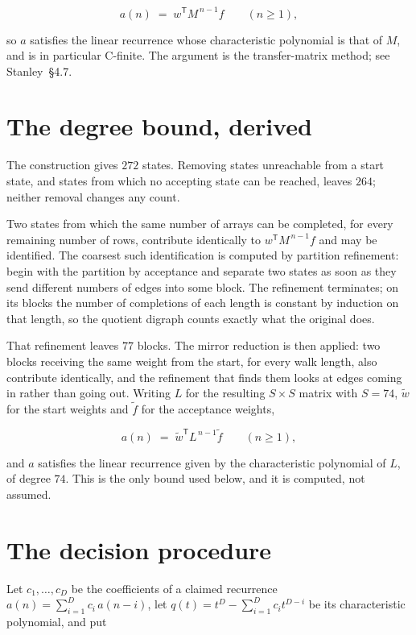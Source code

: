 \documentclass[11pt]{article}
\theoremstyle{definition}
\begin{document}
\[a(n) \;=\; w^{\mathsf T} M^{\,n-1} f \qquad (n \ge 1),\]

so $a$ satisfies the linear recurrence whose characteristic polynomial is that of $M$, and is in particular C-finite. The argument is the transfer-matrix method; see Stanley~\S4.7.

\section{The degree bound, derived}

The construction gives $272$ states. Removing states unreachable from a start state, and states from which no accepting state can be reached, leaves $264$; neither removal changes any count.

Two states from which the same number of arrays can be completed, for every remaining number of rows, contribute identically to $w^{\mathsf T}M^{\,n-1}f$ and may be identified. The coarsest such identification is computed by partition refinement: begin with the partition by acceptance and separate two states as soon as they send different numbers of edges into some block. The refinement terminates; on its blocks the number of completions of each length is constant by induction on that length, so the quotient digraph counts exactly what the original does.

That refinement leaves $77$ blocks. The mirror reduction is then applied: two blocks receiving the same weight from the start, for every walk length, also contribute identically, and the refinement that finds them looks at edges coming in rather than going out. Writing $L$ for the resulting $S \times S$ matrix with $S = 74$, $\tilde w$ for the start weights and $\tilde f$ for the acceptance weights,

\[a(n) \;=\; \tilde w^{\mathsf T} L^{\,n-1} \tilde f \qquad (n \ge 1),\]

and $a$ satisfies the linear recurrence given by the characteristic polynomial of $L$, of degree $74$. This is the only bound used below, and it is computed, not assumed.

\section{The decision procedure}

Let $c_1,\dots,c_D$ be the coefficients of a claimed recurrence $a(n) = \sum_{i=1}^{D} c_i\,a(n-i)$, let $q(t) = t^{D} - \sum_{i=1}^{D} c_i t^{D-i}$ be its characteristic polynomial, and put
\end{document}

